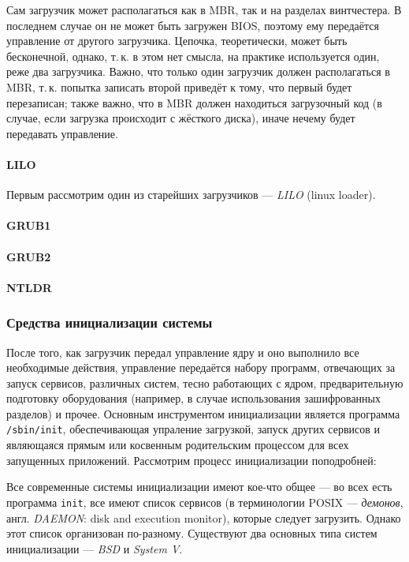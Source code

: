  Сам загрузчик может располагаться как в MBR, так и на разделах винтчестера. В последнем случае он не может быть загружен BIOS, поэтому ему передаётся управление от другого загрузчика. Цепочка, теоретически, может быть бесконечной, однако, т.\,к. в этом нет смысла, на практике используется один, реже два загрузчика. Важно, что только один загрузчик должен располагаться в MBR, т.\,к. попытка записать второй приведёт к тому, что первый будет перезаписан;
 также важно, что в MBR должен находиться загрузочный код (в случае, если загрузка происходит с жёсткого диска), иначе нечему будет передавать управление.
 
 \paragraph{LILO}
 Первым рассмотрим один из старейших загрузчиков --- \emph{LILO} (linux loader). 
 
 \paragraph{GRUB1}
 
 \paragraph{GRUB2}
 
 \paragraph{NTLDR}
  
\subsubsection{Средства инициализации системы}\label{base:os:structure:bootandinit:init}
После того, как загрузчик передал управление ядру и оно выполнило все необходимые действия, управление передаётся набору программ, отвечающих за запуск сервисов, различных систем, тесно работающих с ядром, предварительную подготовку оборудования (например, в случае использования зашифрованных разделов) и прочее.
Основным инструментом инициализации является программа \texttt{/sbin/init}, обеспечивающая упраление загрузкой, запуск других сервисов и являющаяся прямым или косвенным родительским процессом для всех запущенных приложений. Рассмотрим процесс инициализации поподробней:
  
Все современные системы инициализации имеют кое-что общее --- во всех есть программа \texttt{init}, все имеют список сервисов (в терминологии POSIX --- \emph{демонов}, англ. \emph{DAEMON}: disk and execution monitor), которые следует загрузить. Однако этот список организован по-разному. Существуют два основных типа систем инициализации --- \emph{BSD} и \emph{System V}.
  
